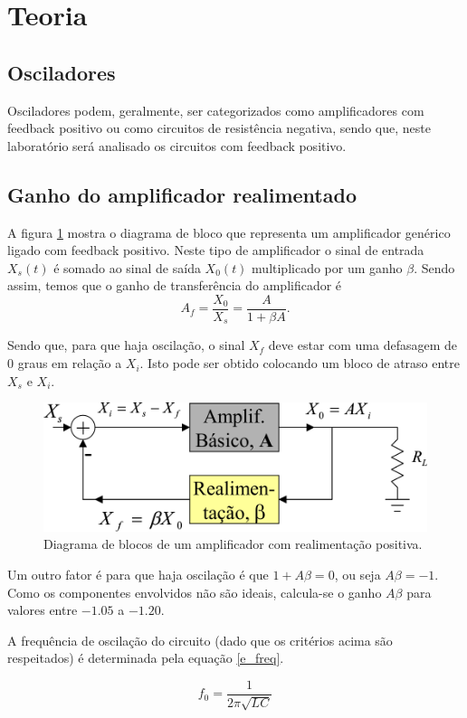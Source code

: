 \newpage
\section{Teoria}
\subsection{Osciladores}
Osciladores podem, geralmente, ser categorizados como amplificadores com feedback positivo ou como circuitos de resistência negativa, sendo que, neste laboratório será analisado os circuitos com feedback positivo.

\subsection{Ganho do amplificador realimentado}
A figura \ref{f_gain} mostra o diagrama de bloco que representa um amplificador genérico ligado com feedback positivo.
Neste tipo de amplificador o sinal de entrada $X_s(t)$ é somado ao sinal de saída $X_0(t)$ multiplicado por um ganho $\beta$. Sendo assim, temos que o ganho de transferência do amplificador é 
\[
A_f = \frac{X_0}{X_s} = \frac{A}{1+\beta A}.
\]

Sendo que, para que haja oscilação, o sinal $X_f$ deve estar com uma defasagem de 0 graus em relação a $X_i$. Isto pode ser obtido colocando um bloco de atraso entre $X_s$ e $X_i$.

\begin{figure}[H]
\centering
\includegraphics[scale=0.5]{Imagens/gain.png}
\caption{Diagrama de blocos de um amplificador com realimentação positiva.}
\label{f_gain}
\end{figure}

Um outro fator é para que haja oscilação é que $1+A\beta = 0$, ou seja $A\beta = -1$.
Como os componentes envolvidos não são ideais, calcula-se o ganho $A\beta$ para valores entre $-1.05$ a $-1.20$.

A frequência de oscilação do circuito (dado que os critérios acima são respeitados) é determinada pela equação \ref{e_freq}.

\begin{equation}
f_0 = \frac{1}{2\pi\sqrt{LC}}
\label{e_freq}
\end{equation}
